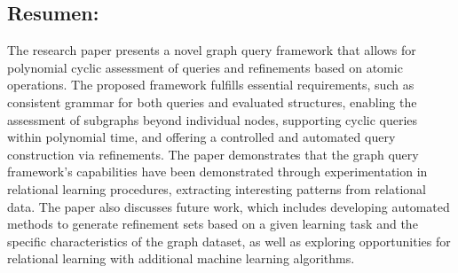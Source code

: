 \documentclass{article}%
\begin{document}
\subsection{Resumen:}%
\label{subsec:Resumen}%
The research paper presents a novel graph query framework that allows for polynomial cyclic assessment of queries and refinements based on atomic operations. The proposed framework fulfills essential requirements, such as consistent grammar for both queries and evaluated structures, enabling the assessment of subgraphs beyond individual nodes, supporting cyclic queries within polynomial time, and offering a controlled and automated query construction via refinements. The paper demonstrates that the graph query framework's capabilities have been demonstrated through experimentation in relational learning procedures, extracting interesting patterns from relational data. The paper also discusses future work, which includes developing automated methods to generate refinement sets based on a given learning task and the specific characteristics of the graph dataset, as well as exploring opportunities for relational learning with additional machine learning algorithms.

%
\end{document}
